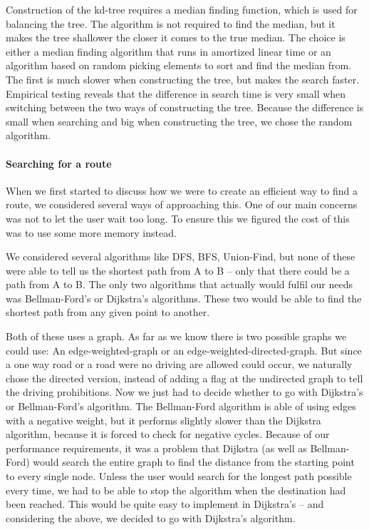 \documentclass[a4paper,10pt,titlepage]{article}
\begin{document}
Construction of the kd-tree requires a median finding function, which is used for balancing the tree. The algorithm is not required to find the median, but it makes the tree shallower the closer it comes to the true median. The choice is either a median finding algorithm that runs in amortized linear time or an algorithm based on random picking elements to sort and find the median from. The first is much slower when constructing the tree, but makes the search faster. Empirical testing reveals that the difference in search time is very small when switching between the two ways of constructing the tree. Because the difference is small when searching and big when constructing the tree, we chose the random algorithm.\\

\paragraph{Searching for a route}
When we first started to discuss how we were to create an efficient way to find a route, we considered several ways of approaching this. One of our main concerns was not to let the user wait too long. To ensure this we figured the cost of this was to use some more memory instead. 

We considered several algorithms like DFS, BFS, Union-Find, but none of these were able to tell us the shortest path from A to B – only that there could be a path from A to B. The only two algorithms that actually would fulfil our needs was Bellman-Ford’s or Dijkstra’s algorithms. These two would be able to find the shortest path from any given point to another. 

Both of these uses a graph. As far as we know there is two possible graphs we could use: An edge-weighted-graph or an edge-weighted-directed-graph. But since a one way road or a road were no driving are allowed could occur, we naturally chose the directed version, instead of adding a flag at the undirected graph to tell the driving prohibitions. Now we just had to decide whether to go with Dijkstra’s or Bellman-Ford’s algorithm.
The Bellman-Ford algorithm is able of using edges with a negative weight, but it performs slightly slower than the  Dijkstra algorithm, because it is forced to check for negative cycles. Because of our performance requirements, it was a problem that Dijkstra (as well as Bellman-Ford) would search the entire graph to find the distance from the starting point to every single node. Unless the user would search for the longest path possible every time, we had to be able to stop the algorithm when the destination had been reached. This would be quite easy to implement in Dijkstra’s – and considering the above, we decided to go with Dijkstra’s algorithm.
\end{document}
